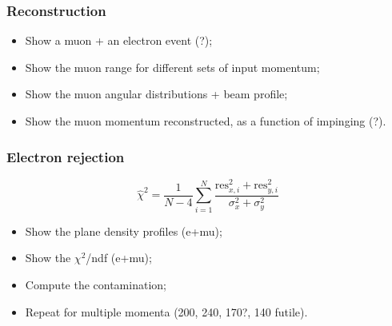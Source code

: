 \subsubsection{Reconstruction}
\begin{itemize}
	\item Show a muon + an electron event (?);
	\item Show the muon range for different sets of input momentum;
	\item Show the muon angular distributions + beam profile;
	\item Show the muon momentum reconstructed, as a function of impinging (?).
\end{itemize}

\subsubsection{Electron rejection}

\begin{equation}
\hat{\chi}^2=\frac{1}{N-4}\sum_{i=1}^{N}\frac{\text{res}_{x,i}^2+\text{res}_{y,i}^2}{\sigma_x^2+\sigma_y^2}
\end{equation}

\begin{itemize}
	\item Show the plane density profiles (e+mu);
	\item Show the $\chi^2$/ndf (e+mu);
	\item Compute the contamination;
	\item Repeat for multiple momenta (200, 240, 170?, 140 futile).
\end{itemize}



